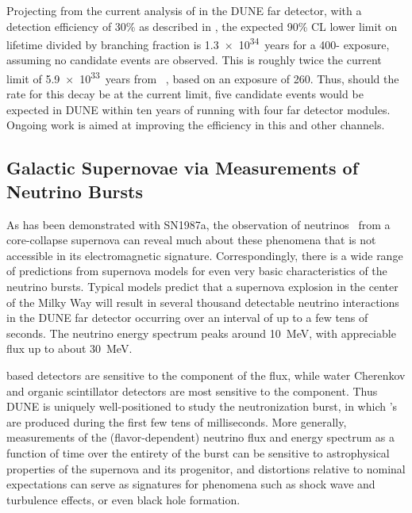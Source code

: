 Projecting from the current analysis of \ptoknubar in the DUNE 
far detector, with a detection efficiency of \num{30}\% as 
described in \physchndk, the 
expected 90\% CL lower limit on lifetime divided by branching 
fraction is \SI{1.3e34}{years} for a 
\num{400}-\SI{}{\ktyr} 
exposure, assuming no candidate events are observed.  This 
is roughly twice the current limit of 
\SI{5.9e33}{years} from \superk~\cite{Abe:2014mwa}, 
based on an exposure of \SI{260}{\ktyr}.  Thus, should the rate 
for this decay be at the current \superk limit, five candidate 
events would be expected in DUNE within ten years 
of running with four far detector modules.  Ongoing work is aimed 
at improving the efficiency in this and other channels.

\subsection{Galactic Supernovae via Measurements of Neutrino Bursts}
\label{sec:es:phys:galact}

As has been demonstrated with SN1987a, the observation 
of neutrinos~\cite{Bionta:1987qt,Hirata:1987hu} from a 
core-collapse supernova can reveal much about these  
phenomena that is not accessible in its  
electromagnetic signature.  Correspondingly, there is a 
wide range of predictions from supernova models for even 
very basic characteristics of the neutrino bursts.  Typical  
models predict that a supernova explosion in the 
center of the Milky Way will result in several thousand 
detectable neutrino interactions in the DUNE far detector 
occurring over an interval of up to a few tens of seconds.
The neutrino energy spectrum peaks around \SI{10}{MeV}, 
with appreciable flux up to about \SI{30}{MeV}.

\lar based detectors are sensitive to the \nue 
component of the flux, while water Cherenkov and organic 
scintillator detectors are most sensitive to the \anue 
component.  Thus DUNE is uniquely well-positioned to study the 
neutronization burst, in which \nue's are produced during the 
first few tens of milliseconds.  More generally,  
measurements of the (flavor-dependent) neutrino flux and energy 
spectrum as a function of time over the entirety of the burst 
can be sensitive to astrophysical properties of the supernova 
and its progenitor, and distortions relative to nominal 
expectations can serve as signatures for phenomena such 
as shock wave and turbulence effects, or even black hole 
formation.  

